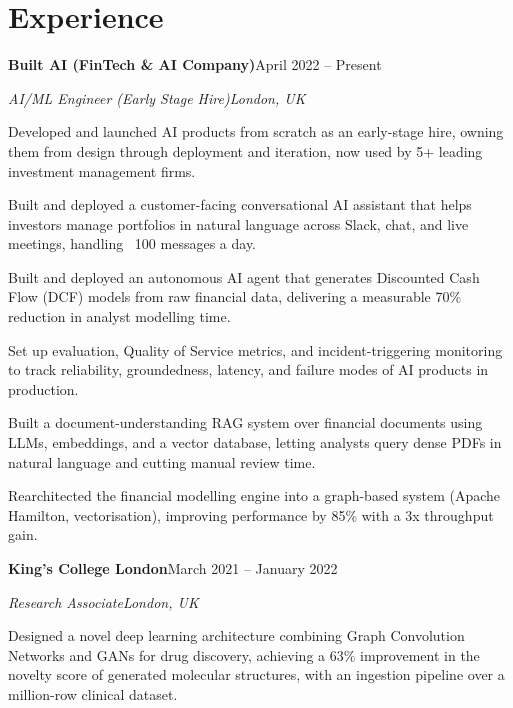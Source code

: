 \documentclass[10pt,a4paper]{article}
\newcommand{\entry}[4]{%
  {\color{company}\bfseries #1}\hfill {\color{muted}#2}\par
  \vspace{1pt}
  {\itshape #3}\hfill {\color{muted}\itshape #4}\par
  \vspace{3pt}%
}
\begin{document}
\section{Experience}
\entry{Built AI (FinTech \& AI Company)}{April 2022 -- Present}{AI/ML Engineer (Early Stage Hire)}{London, UK}
\begin{tight}
  \item Developed and launched AI products from scratch as an early-stage hire, owning them from design through deployment and iteration, now used by 5+ leading investment management firms.
  \item Built and deployed a customer-facing conversational AI assistant that helps investors manage portfolios in natural language across Slack, chat, and live meetings, handling ~100 messages a day.
  \item Built and deployed an autonomous AI agent that generates Discounted Cash Flow (DCF) models from raw financial data, delivering a measurable 70\% reduction in analyst modelling time.
  \item Set up evaluation, Quality of Service metrics, and incident-triggering monitoring to track reliability, groundedness, latency, and failure modes of AI products in production.
  \item Built a document-understanding RAG system over financial documents using LLMs, embeddings, and a vector database, letting analysts query dense PDFs in natural language and cutting manual review time.
  \item Rearchitected the financial modelling engine into a graph-based system (Apache Hamilton, vectorisation), improving performance by 85\% with a 3x throughput gain.
\end{tight}

\entry{King's College London}{March 2021 -- January 2022}{Research Associate}{London, UK}
\begin{tight}
  \item Designed a novel deep learning architecture combining Graph Convolution Networks and GANs for drug discovery, achieving a 63\% improvement in the novelty score of generated molecular structures, with an ingestion pipeline over a million-row clinical dataset.
\end{tight}

\end{document}
